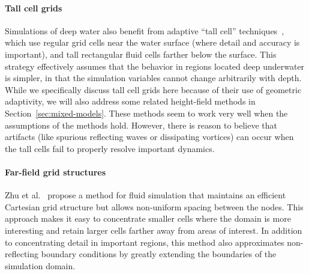 \paragraph*{Tall cell grids} Simulations of deep water also benefit from adaptive ``tall cell'' techniques~\cite{Irving2006,Chentanez2011}, which use regular grid cells near the water surface (where detail and accuracy is important), and tall rectangular fluid cells farther below the surface. This strategy effectively assumes that the behavior in regions located deep underwater is simpler, in that the simulation variables cannot change arbitrarily with depth. While we specifically discuss tall cell grids here because of their use of geometric adaptivity, we will also address some related height-field methods in Section~\ref{sec:mixed-models}. These methods seem to work very well when the assumptions of the methods hold. However, there is reason to believe that artifacts (like spurious reflecting waves or dissipating vortices) can occur when the tall cells fail to properly resolve important dynamics.

\paragraph*{Far-field grid structures} Zhu et al.~\cite{Zhu2013} propose a method for fluid simulation that maintains an efficient Cartesian grid structure but allows non-uniform spacing between the nodes.
This approach makes it easy to concentrate smaller cells where the domain is more interesting and retain larger cells farther away from areas of interest.
In addition to concentrating detail in important regions, this method also approximates non-reflecting boundary conditions by greatly extending the boundaries of the simulation domain.

